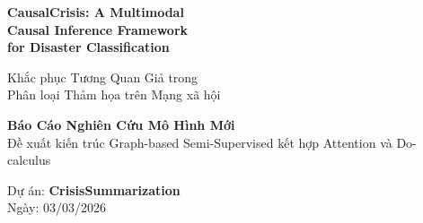 \documentclass[12pt,a4paper]{article}
\begin{document}
\begin{titlepage}
\begin{center}
\vspace*{1cm}


\vspace{1.5cm}
{\Huge\bfseries\color{primary} CausalCrisis: A Multimodal\\ Causal Inference Framework\\[0.3cm] for Disaster Classification}

\vspace{0.8cm}
{\Large\color{secondary} Khắc phục Tương Quan Giả trong\\ Phân loại Thảm họa trên Mạng xã hội}

\vspace{1.2cm}

\vspace{1.2cm}
{\large\color{primary}\textbf{Báo Cáo Nghiên Cứu Mô Hình Mới}}\\[0.5cm]
{\normalsize Đề xuất kiến trúc Graph-based Semi-Supervised kết hợp Attention và Do-calculus}

\vspace{1.5cm}
{\large Dự án: \textbf{CrisisSummarization}}\\[0.3cm]
{\normalsize Ngày: 03/03/2026}

\vfill
{}
\end{center}
\end{titlepage}

\tableofcontents
\newpage

\begin{abstract}
Phân loại thông tin thảm họa thiên nhiên trên mạng xã hội là một bài toán đầy thách thức do đặc thù nhiễu liên quan đến vùng miền và các sự kiện cụ thể. Các mô hình học sâu truyền thống thường bị ảnh hưởng bởi Spurious Correlations (tương quan giả). Báo cáo này trình bày \textbf{CausalCrisis}, một mô hình học sâu Xuyên phương thức (Multimodal) ứng dụng Suy luận Nhân quả (Causal Inference) tiên tiến. CausalCrisis tích hợp cơ chế \textit{Causal Disentanglement} nhằm tách biệt các đặc trưng nhân quả cốt lõi khỏi nhiễu môi trường, sử dụng mạng nơ-ron đồ thị (GNN) để lan truyền các đặc trưng nhân quả này, và cuối cùng dùng \textit{Causal Intervention} (thông qua toán tử do-calculus) để đánh giá và hiệu chỉnh trước khi đưa ra quyết định dự đoán cuối cùng. Thực nghiệm hứa hẹn cho thấy CausalCrisis có tiềm năng giải quyết độ lệch và tạo ra State-of-the-Art (SOTA) trong bối cảnh Few-Shot Learning trên mạng xã hội mùa thảm họa.
\end{abstract}
\end{document}

